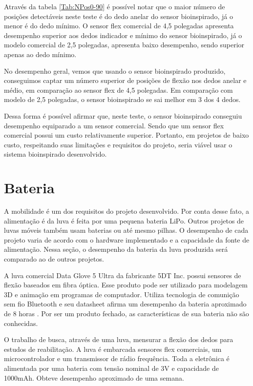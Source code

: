 \documentclass[
	12pt,				%
	openright,			%
	oneside,			%
	a4paper,			%
	english,			%
	brazil				%
	]{abntex2}
\begin{document}
		Através da tabela \ref{Tab:NPos0-90} é possível notar que o maior número de posições detectáveis neste teste é do dedo anelar do sensor bioinspirado, já o menor é do dedo mínimo. O sensor flex comercial de 4,5 polegadas apresenta desempenho superior aos dedos indicador e mínimo do sensor bioinspirado, já o modelo comercial de 2,5 polegadas, apresenta baixo desempenho, sendo superior apenas ao dedo mínimo.

		No desempenho geral, vemos que usando o sensor bioinspirado produzido, conseguimos captar um número superior de posições de flexão nos dedos anelar e médio, em comparação ao sensor flex de 4,5 polegadas. Em comparação com modelo de 2,5 polegadas, o sensor bioinspirado se sai melhor em 3 dos 4 dedos.

		Dessa forma é possível afirmar que, neste teste, o sensor bioinspirado conseguiu desempenho equiparado a um sensor comercial. Sendo que um sensor flex comercial possui um custo relativamente superior. Portanto, em projetos de baixo custo, respeitando suas limitações e requisitos do projeto, seria viável usar o sistema bioinspirado desenvolvido.


			\section{Bateria}

			A mobilidade é um dos requisitos do projeto desenvolvido. Por conta desse fato, a alimentação é da luva é feita por uma pequena bateria LiPo. Outros projetos de luvas móveis também usam baterias ou até mesmo pilhas. O desempenho de cada projeto varia de acordo com o hardware implementado e a capacidade da fonte de alimentação. Nessa seção, o desempenho da bateria da luva produzida será comparado ao de outros projetos.

			A luva comercial Data Glove 5 Ultra da fabricante 5DT Inc. possui sensores de flexão baseados em fibra óptica. Esse produto pode ser utilizado para modelagem 3D e animação em programas de computador. Utiliza tecnologia de comunição sem fio Bluetooth e seu datasheet afirma um desempenho da bateria aproximado de 8 horas \cite{5DT-ultra}. Por ser um produto fechado, as características de sua bateria não são conhecidas.

			O trabalho de \cite{michela2013rehab} busca, através de uma luva, mensurar a flexão dos dedos para estudos de reabilitação. A luva é embarcada sensores flex comerciais, um microcontrolador e um transmissor de rádio frequência. Toda a eletrônica é alimentada por uma bateria com tensão nominal de 3V e capacidade de 1000mAh. Obteve desempenho aproximado de uma semana.
			
\end{document}
